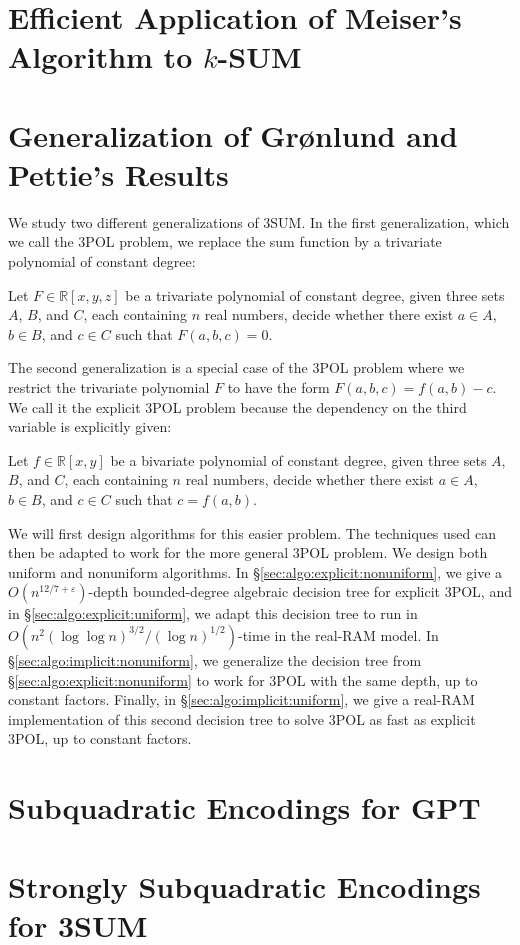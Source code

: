 \section{Efficient Application of Meiser's Algorithm to \(k\)-SUM}

\section{Generalization of Gr\o nlund and Pettie's Results}

We study two different generalizations of 3SUM\@. In the first generalization,
which we call the 3POL problem, we replace the sum function by a trivariate
polynomial of constant degree:
\begin{problem}[3POL]
Let $F \in \mathbb{R}[x,y,z]$ be a trivariate polynomial of constant degree,
given three sets $A$, $B$, and $C$, each containing $n$ real numbers, decide
whether there exist $a \in A$, $b \in B$, and $c \in C$ such that
$F(a,b,c)=0$.
\end{problem}
The second generalization is a special case of the 3POL problem where we
restrict the trivariate polynomial $F$ to have the form $F(a,b,c) = f(a,b) -
c$. We call it the explicit 3POL problem because the dependency on the third
variable is explicitly given:
\begin{problem}
Let $f \in \mathbb{R}[x,y]$ be a bivariate polynomial of constant degree,
given three sets $A$, $B$, and $C$, each containing $n$ real numbers, decide
whether there exist $a \in A$, $b \in B$, and $c \in C$ such that $c=f(a,b)$.
\end{problem}
We will first design algorithms for this easier problem. The techniques used can
then be adapted to work for the more general 3POL problem. We design both
uniform and nonuniform algorithms.
%
In \S\ref{sec:algo:explicit:nonuniform},
we give a $O(n^{12/7+\varepsilon})$-depth bounded-degree
algebraic decision tree for explicit 3POL, and in
\S\ref{sec:algo:explicit:uniform}, we adapt this decision tree
to run in $O(n^2 {(\log \log n)}^{3/2} / {(\log n)}^{1/2})$-time
in the real-RAM model.
%
In \S\ref{sec:algo:implicit:nonuniform}, we generalize the decision tree from
\S\ref{sec:algo:explicit:nonuniform} to work for 3POL with the same depth, up
to constant factors.
%
Finally, in \S\ref{sec:algo:implicit:uniform}, we give a real-RAM
implementation of this second decision tree to solve 3POL as fast as
explicit 3POL, up to constant factors.

\section{Subquadratic Encodings for GPT}

\section{Strongly Subquadratic Encodings for 3SUM}
